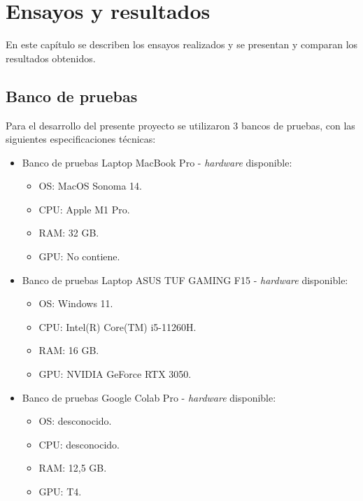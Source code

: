 
\chapter{Ensayos y resultados} %

\label{Chapter4} %

En este capítulo se describen los ensayos realizados y se presentan y comparan los resultados obtenidos.

\section{Banco de pruebas}
\label{sec:pruebasHW}

Para el desarrollo del presente proyecto se utilizaron 3 bancos de pruebas, con las siguientes especificaciones técnicas:

\begin{itemize}
\item Banco de pruebas Laptop MacBook Pro - \textit{hardware} disponible:
	\begin{itemize}
	\item OS: MacOS Sonoma 14.
	\item CPU: Apple M1 Pro.
	\item RAM: 32 GB.
	\item GPU: No contiene.
	\end{itemize}
\item Banco de pruebas Laptop ASUS TUF GAMING F15 - \textit{hardware} disponible:
	\begin{itemize}
	\item OS: Windows 11.
	\item CPU: Intel(R) Core(TM) i5-11260H.
	\item RAM: 16 GB.
	\item GPU: NVIDIA GeForce RTX 3050.
	\end{itemize}
\item Banco de pruebas Google Colab Pro - \textit{hardware} disponible:
	\begin{itemize}
	\item OS: desconocido.
	\item CPU: desconocido.
	\item RAM: 12,5 GB.
	\item GPU: T4.
	\end{itemize}
\end{itemize}


